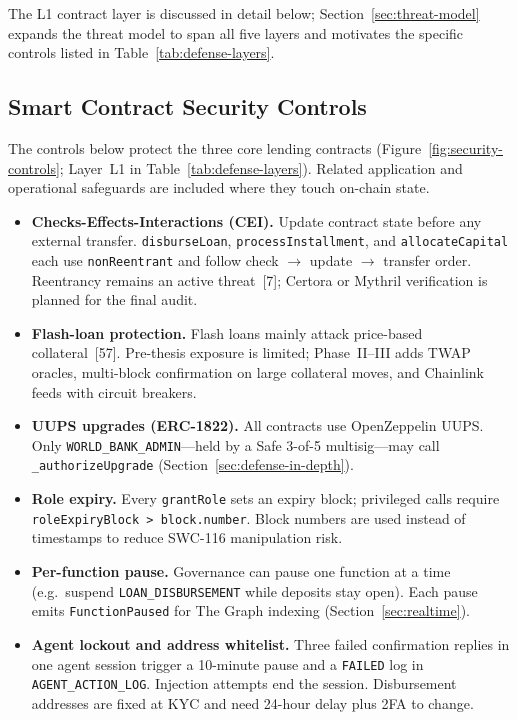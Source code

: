 \documentclass[12pt, a4paper]{report}
\begin{document}
The L1 contract layer is discussed in detail below; Section~\ref{sec:threat-model} expands the threat model to span all five layers and motivates the specific controls listed in Table~\ref{tab:defense-layers}.

\subsection{Smart Contract Security Controls}
\label{sec:contract-security}

The controls below protect the three core lending contracts (Figure~\ref{fig:security-controls}; Layer~L1 in Table~\ref{tab:defense-layers}). Related application and operational safeguards are included where they touch on-chain state.

\begin{itemize}[noitemsep]
\item \textbf{Checks-Effects-Interactions (CEI).} Update contract state before any external transfer. \texttt{disburseLoan}, \texttt{processInstallment}, and \texttt{allocateCapital} each use \texttt{nonReentrant} and follow check $\to$ update $\to$ transfer order. Reentrancy remains an active threat~[7]; Certora or Mythril verification is planned for the final audit.

\item \textbf{Flash-loan protection.} Flash loans mainly attack price-based collateral~[57]. Pre-thesis exposure is limited; Phase~II--III adds TWAP oracles, multi-block confirmation on large collateral moves, and Chainlink feeds with circuit breakers.

\item \textbf{UUPS upgrades (ERC-1822).} All contracts use OpenZeppelin UUPS. Only \texttt{WORLD\_BANK\_ADMIN}---held by a Safe 3-of-5 multisig---may call \texttt{\_authorizeUpgrade} (Section~\ref{sec:defense-in-depth}).

\item \textbf{Role expiry.} Every \texttt{grantRole} sets an expiry block; privileged calls require \texttt{roleExpiryBlock > block.number}. Block numbers are used instead of timestamps to reduce SWC-116 manipulation risk.

\item \textbf{Per-function pause.} Governance can pause one function at a time (e.g.\ suspend \texttt{LOAN\_DISBURSEMENT} while deposits stay open). Each pause emits \texttt{FunctionPaused} for The Graph indexing (Section~\ref{sec:realtime}).

\item \textbf{Agent lockout and address whitelist.} Three failed confirmation replies in one agent session trigger a 10-minute pause and a \texttt{FAILED} log in \texttt{AGENT\_ACTION\_LOG}. Injection attempts end the session. Disbursement addresses are fixed at KYC and need 24-hour delay plus 2FA to change.


\end{itemize}
\end{document}

